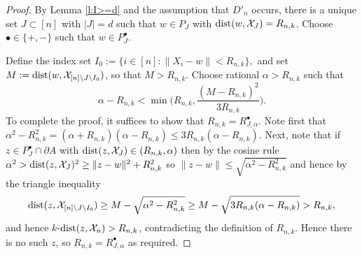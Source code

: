 \documentclass[12pt]{article}
\newcommand{\cX}{\mathcal{X}}
\newcommand{\X}{\mathcal{X}}
\newcommand{\dist}{{\rm dist}}
\begin{document}
	\begin{proof}
	By Lemma \ref{l:I>=d} and the assumption that $D'_n$ occurs,
	there is a unique set $J \subset [n]$ with $|J|=d$
	such that $w \in P_J$ with $\dist(w,\cX_J) = R_{n,k}$.
	Choose $\bullet \in \{+,-\}$ such that $w \in P_J^\bullet$.
	
	Define the index set
	$
	I_0 := \{i \in [n]: \| X_i - w \| < R_{n,k}\},
	$
		and set $M:= \dist(w, \X_{[n] \setminus J \setminus I_0})$,
		so that $M > R_{n,k}$. 
	Choose rational  $\alpha > R_{n,k}$ such that
	$$
	\alpha - R_{n,k} < \min \Big( R_{n,k}, \frac{(M-R_{n,k})^2}{3 R_{n,k}}
	\Big).
	$$
		To complete the proof, it suffices to
		show that  $R_{n,k} = R_{J,\alpha}^\bullet$.
		Note first that
	$
	\alpha^2 - R_{n,k}^2 = (\alpha+R_{n,k})(\alpha - R_{n,k})
	\leq 3 R_{n,k}(\alpha- R_{n,k}).
	$
	Next, note that
	if $z \in P_J^\bullet \cap \partial A$ with
	$\dist(z,\X_J) \in (R_{n,k},\alpha)$ then
	by the cosine rule
		$\alpha^2 > \dist(z,\X_J)^2 \geq 
		\|z-w\|^2+ R_{n,k}^2$ so
	$ \|z-w\| \leq \sqrt{\alpha^2-R_{n,k}^2} $
		and hence by the triangle inequality
	\begin{align*}
		\dist(z,\X_{[n] \setminus J \setminus I_0} )
		\geq M - 
	\sqrt{\alpha^2-R_{n,k}^2}
		\geq 
		M -  \sqrt{3 R_{n,k} (\alpha - R_{n,k}) } 
		> R_{n,k},
	\end{align*}
	and hence $k$-$\dist(z,\X_n) %
		> R_{n,k}$,
	contradicting the definition of $R_{n,k}$. 
		Hence there is no such $z$, so
		$R_{n,k} = R^\bullet_{J, \alpha}$ as required.
	\end{proof}
\end{document}
